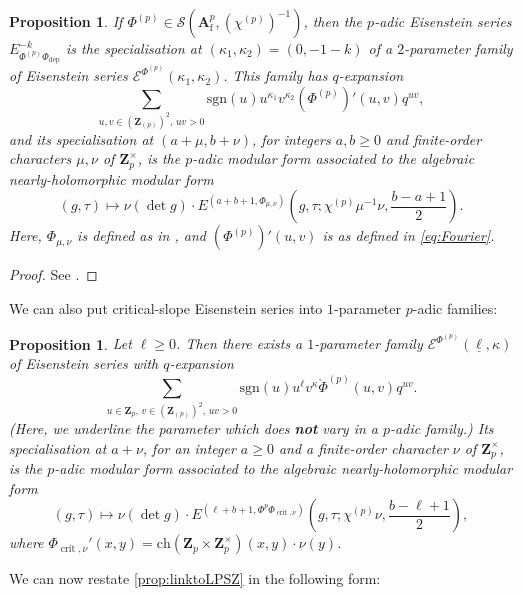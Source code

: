 \documentclass[cjm]{ipart}
\theoremstyle{plain}
\newtheorem{proposition}[theorem]{Proposition}
\newtheorem{corollary}[theorem]{Corollary}
\theoremstyle{remark}
\DeclareMathOperator{\crit}{crit}
\newcommand{\Af}{\AA_{\mathrm{f}}}
\newcommand{\ZZ}{\mathbf{Z}}
\newcommand{\Zp}{\mathbf{Z}_p}
\newcommand{\cE}{\mathcal{E}}
\newcommand{\cS}{\mathcal{S}}
\newcommand{\ch}{\mathrm{ch}}
\newcommand{\dep}{\mathrm{dep}}
\renewcommand{\AA}{\mathbf{A}}
\numberwithin{equation}{subsection}
\renewcommand{\geq}{\geqslant}
\begin{document}
  \begin{proposition}
   If $\Phi^{(p)} \in \cS(\Af^p, (\chi^{(p)})^{-1})$, then the $p$-adic Eisenstein series $E^{-k}_{\Phi^{(p)}\Phi_{\dep}}$ is the specialisation at $(\kappa_1,\kappa_2)=(0,-1-k)$ of a $2$-parameter family of Eisenstein series $\cE^{\Phi^{(p)}}(\kappa_1,\kappa_2)$.  This family has $q$-expansion
   \[ \sum_{u,v\in (\ZZ_{(p)})^2,\, uv>0} \mathrm{sgn}(u) u^{\kappa_1}v^{\kappa_2}(\Phi^{(p)})'(u,v)q^{uv},\]
   and its specialisation at $(a+\mu,b+\nu)$, for integers $a,b\geq 0$ and finite-order characters $\mu,\nu$ of $\Zp^\times$, is the $p$-adic modular form associated to the algebraic nearly-holomorphic modular form
   \[ (g,\tau)\mapsto \nu(\det g)\cdot E^{(a+b+1,\Phi_{\mu,\nu})}\left(g,\tau;\chi^{(p)}\mu^{-1} \nu, \frac{b-a+1}{2}\right).\]
   Here, $\Phi_{\mu,\nu}$ is defined as in \cite[\S 7.3]{LPSZ1}, and $(\Phi^{(p)})'(u,v)$ is as defined in \eqref{eq:Fourier}.
  \end{proposition}
  \begin{proof}
   See \cite[Theorem 7.6]{LPSZ1}.
  \end{proof}

  We can also put critical-slope Eisenstein series into $1$-parameter $p$-adic families:

  \begin{proposition}
   Let $\ell\geq 0$. Then there exists a $1$-parameter family $\cE^{\Phi^{(p)}}(\underline{\ell},\kappa)$ of Eisenstein series  with $q$-expansion
   \[  \sum_{u\in \Zp,\, v\in (\ZZ_{(p)})^2,\, uv>0} \mathrm{sgn}(u) u^{\ell}v^{\kappa}\grave{\Phi}^{(p)}(u,v)q^{uv}.\]
   (Here, we underline the parameter which does \textbf{not} vary in a $p$-adic family.)
   Its specialisation at $a+\nu$, for an integer $a\geq 0$ and a finite-order character $\nu$ of $\Zp^\times$, is the $p$-adic modular form associated to the algebraic nearly-holomorphic modular form
   \[ (g,\tau)\mapsto \nu(\det g)\cdot E^{(\ell + b +1,\Phi^p \Phi_{\crit, \nu})}\left(g,\tau;\chi^{(p)}\nu, \frac{b-\ell+1}{2}\right),\]
   where $\Phi_{\crit, \nu}'(x,y) = \ch(\Zp \times \Zp^\times)(x,y) \cdot \nu(y)$.
  \end{proposition}
%
%
  We can now restate \cref{prop:linktoLPSZ} in the following form:
\end{document}
